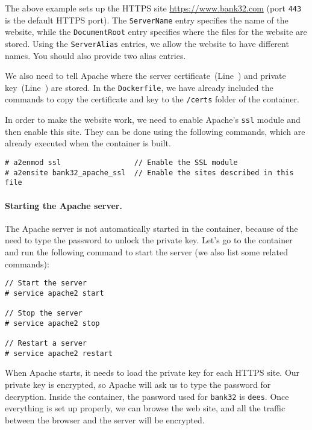 The above example sets up the HTTPS site \url{https://www.bank32.com} (port \texttt{443} 
is the default HTTPS port). 
The \texttt{ServerName} entry specifies the name of the website, while
the \texttt{DocumentRoot} entry specifies where the files for 
the website are stored. Using the \texttt{ServerAlias} entries, we allow
the website to have different names. You should also provide two
alias entries. 

We also need to tell Apache where
the server certificate~(Line~) and private key~(Line~) are stored. 
In the \texttt{Dockerfile}, we have already included the commands to copy
the certificate and key to the \texttt{/certs} folder of the container.  


In order to make the website work, we need to enable Apache's \texttt{ssl} module and 
then enable this site. They can be done using the following commands, 
which are already executed when the container is built. 

\begin{lstlisting}
# a2enmod ssl                 // Enable the SSL module 
# a2ensite bank32_apache_ssl  // Enable the sites described in this file
\end{lstlisting}
 


\paragraph{Starting the Apache server.} The Apache server 
is not automatically started in the container, because of the 
need to type the password to unlock the private key. 
Let's go to the container and 
run the following command to start the server (we also list
some related commands): 

\begin{lstlisting}
// Start the server 
# service apache2 start

// Stop the server 
# service apache2 stop

// Restart a server 
# service apache2 restart
\end{lstlisting}


When Apache starts, it needs to load the private key for each HTTPS 
site. Our private key is encrypted, so Apache will ask us to type the password 
for decryption. Inside the container, the password used for \texttt{bank32}
is \texttt{dees}.  Once everything is set up properly, we can
browse the web site, and all the traffic between the browser and the server 
will be encrypted.


